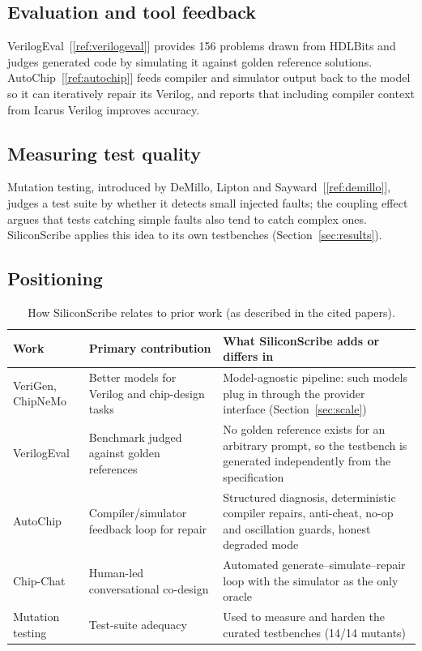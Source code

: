 \documentclass[11pt,a4paper]{article}
\renewcommand{\cite}[1]{[\ref{ref:#1}]}
\begin{document}
\subsection{Evaluation and tool feedback}
VerilogEval~\cite{verilogeval} provides 156 problems drawn from HDLBits and judges generated code by simulating it against golden reference solutions. AutoChip~\cite{autochip} feeds compiler and simulator output back to the model so it can iteratively repair its Verilog, and reports that including compiler context from Icarus Verilog improves accuracy.

\subsection{Measuring test quality}
Mutation testing, introduced by DeMillo, Lipton and Sayward~\cite{demillo}, judges a test suite by whether it detects small injected faults; the coupling effect argues that tests catching simple faults also tend to catch complex ones. SiliconScribe applies this idea to its own testbenches (Section~\ref{sec:results}).

\subsection{Positioning}
\begin{table}[H]
\centering
\caption{How SiliconScribe relates to prior work (as described in the cited papers).}
\label{tab:related}
\footnotesize
\begin{tabularx}{\textwidth}{@{}p{2.6cm}p{4.6cm}X@{}}
\toprule
\textbf{Work} & \textbf{Primary contribution} & \textbf{What SiliconScribe adds or differs in} \\
\midrule
VeriGen, ChipNeMo & Better models for Verilog and chip-design tasks & Model-agnostic pipeline: such models plug in through the provider interface (Section~\ref{sec:scale}) \\
VerilogEval & Benchmark judged against golden references & No golden reference exists for an arbitrary prompt, so the testbench is generated independently from the specification \\
AutoChip & Compiler/simulator feedback loop for repair & Structured diagnosis, deterministic compiler repairs, anti-cheat, no-op and oscillation guards, honest degraded mode \\
Chip-Chat & Human-led conversational co-design & Automated generate--simulate--repair loop with the simulator as the only oracle \\
Mutation testing & Test-suite adequacy & Used to measure and harden the curated testbenches (14/14 mutants) \\
\bottomrule
\end{tabularx}
\end{table}
\end{document}
